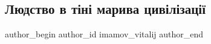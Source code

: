  
 
 
 
 
 
\subsection{Людство в тіні марива цивілізації}
\label{sec:18_08_2021.fb.imamov_vitalij.2.chelovek_civilizacia}
 
\ifcmt
 author_begin
   author_id imamov_vitalij
 author_end
\fi


